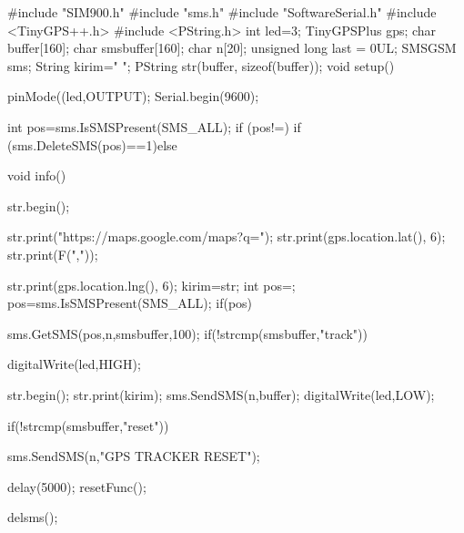 #include "SIM900.h"
#include "sms.h"
#include "SoftwareSerial.h"
#include <TinyGPS++.h>
#include <PString.h>
int led=3;
TinyGPSPlus gps;
char buffer[160];
char smsbuffer[160];
char n[20];
unsigned long last = 0UL;
SMSGSM sms;
String kirim=" ";
PString str(buffer, sizeof(buffer));
void setup(){
  pinMode((led,OUTPUT);
  Serial.begin(9600);
















 {  
int pos=sms.IsSMSPresent(SMS_ALL);
if (pos!=)
      {
if (sms.DeleteSMS(pos)==1){}else{}
     }
  }
}

void info(){
  str.begin();

str.print("https://maps.google.com/maps?q=");
str.print(gps.location.lat(), 6);
str.print(F(","));

str.print(gps.location.lng(), 6);
    kirim=str;
int pos=;
pos=sms.IsSMSPresent(SMS_ALL);
if(pos){

    sms.GetSMS(pos,n,smsbuffer,100);
if(!strcmp(smsbuffer,"track")){
    digitalWrite(led,HIGH);
 
 
      str.begin();
str.print(kirim);
sms.SendSMS(n,buffer);
 digitalWrite(led,LOW); 
 }
    if(!strcmp(smsbuffer,"reset")){

sms.SendSMS(n,"GPS TRACKER RESET");

 delay(5000);
resetFunc(); 
   }
    delsms();
  }
  
  
}